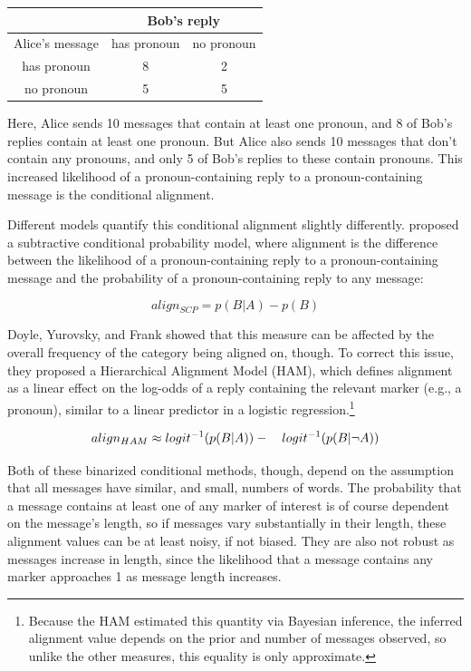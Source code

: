 \documentclass[11pt]{article}
\begin{document}
\begin{center}
\begin{tabular}{|c||c|c|}
\hline
& \multicolumn{2}{|c|}{Bob's reply} \\
\hline
Alice's message & has pronoun & no pronoun \\ \hline
has pronoun & 8 & 2\\
no pronoun & 5 & 5\\
\hline
\end{tabular}
\end{center}

Here, Alice sends 10 messages that contain at least one pronoun, and 8 of Bob's replies contain at least one pronoun.  But Alice also sends 10 messages that don't contain any pronouns, and only 5 of Bob's replies to these contain pronouns. This increased likelihood of a pronoun-containing reply to a pronoun-containing message is the conditional alignment.

Different models quantify this conditional alignment slightly differently.  \cite{DNMGamonDumais2011} proposed a subtractive conditional probability model, where alignment is the difference between the likelihood of a pronoun-containing reply to a pronoun-containing message and the probability of a pronoun-containing reply to any message:

\begin{equation}
align_{SCP} = p(B|A) - p(B)
\end{equation}

Doyle, Yurovsky, and Frank  showed that this measure can be affected by the overall frequency of the category being aligned on, though. To correct this issue, they proposed a Hierarchical Alignment Model (HAM), which defines alignment as a linear effect on the log-odds of a reply containing the relevant marker (e.g., a pronoun), similar to a linear predictor in a logistic regression.\footnote{Because the HAM estimated this quantity via Bayesian inference, the inferred alignment value depends on the prior and number of messages observed, so unlike the other measures, this equality is only approximate.}

\begin{dmath}
align_{HAM} \approx logit^{-1}(p(B|A)) - \\ \hspace*{1em} logit^{-1}(p(B|\neg A))
\end{dmath}

Both of these binarized conditional methods, though, depend on the assumption that all messages have similar, and small, numbers of words. The probability that a message contains at least one of any marker of interest is of course dependent on the message's length, so if messages vary substantially in their length, these alignment values can be at least noisy, if not biased. They are also not robust as messages increase in length, since the likelihood that a message contains any marker approaches 1 as message length increases.
\end{document}
